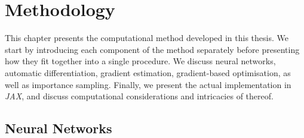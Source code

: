 \ifpdf
\graphicspath{{Chapter4/Figs/Raster/}{Chapter4/Figs/PDF/}{Chapter4/Figs/}}
\else
\graphicspath{{Chapter4/Figs/Vector/}{Chapter4/Figs/}}
\fi


\chapter{Methodology}
\label{chapter4}
This chapter presents the computational method developed in this thesis. We start by introducing each component of the method separately before presenting how they fit together into a single procedure. We discuss neural networks, automatic differentiation, gradient estimation, gradient-based optimisation, as well as importance sampling. Finally, we present the actual implementation in \emph{JAX}, and discuss computational considerations and intricacies of thereof.

\section{Neural Networks} %
